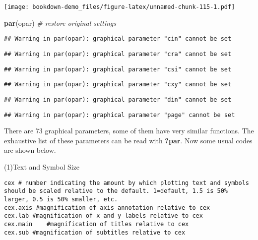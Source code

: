 \documentclass[]{book}
\newenvironment{Shaded}{\begin{snugshade}}{\end{snugshade}}
\newcommand{\KeywordTok}[1]{\textcolor[rgb]{0.13,0.29,0.53}{\textbf{#1}}}
\newcommand{\CommentTok}[1]{\textcolor[rgb]{0.56,0.35,0.01}{\textit{#1}}}
\newcommand{\NormalTok}[1]{#1}
\theoremstyle{definition}
\theoremstyle{definition}
\theoremstyle{definition}
\theoremstyle{remark}
\begin{document}
\texttt{[image: bookdown-demo\_files/figure-latex/unnamed-chunk-115-1.pdf]}

\begin{Shaded}
\begin{Highlighting}[]
\KeywordTok{par}\NormalTok{(opar)          }\CommentTok{# restore original settings}
\end{Highlighting}
\end{Shaded}

\begin{verbatim}
## Warning in par(opar): graphical parameter "cin" cannot be set
\end{verbatim}

\begin{verbatim}
## Warning in par(opar): graphical parameter "cra" cannot be set
\end{verbatim}

\begin{verbatim}
## Warning in par(opar): graphical parameter "csi" cannot be set
\end{verbatim}

\begin{verbatim}
## Warning in par(opar): graphical parameter "cxy" cannot be set
\end{verbatim}

\begin{verbatim}
## Warning in par(opar): graphical parameter "din" cannot be set
\end{verbatim}

\begin{verbatim}
## Warning in par(opar): graphical parameter "page" cannot be set
\end{verbatim}

There are 73 graphical parameters, some of them have very similar
functions. The exhaustive list of these parameters can be read with
\textbf{?par}. Now some usual codes are shown below.

(1)Text and Symbol Size

\begin{verbatim}
cex # number indicating the amount by which plotting text and symbols should be scaled relative to the default. 1=default, 1.5 is 50% larger, 0.5 is 50% smaller, etc.
cex.axis #magnification of axis annotation relative to cex
cex.lab #magnification of x and y labels relative to cex
cex.main    #magnification of titles relative to cex
cex.sub #magnification of subtitles relative to cex
\end{verbatim}
\end{document}
